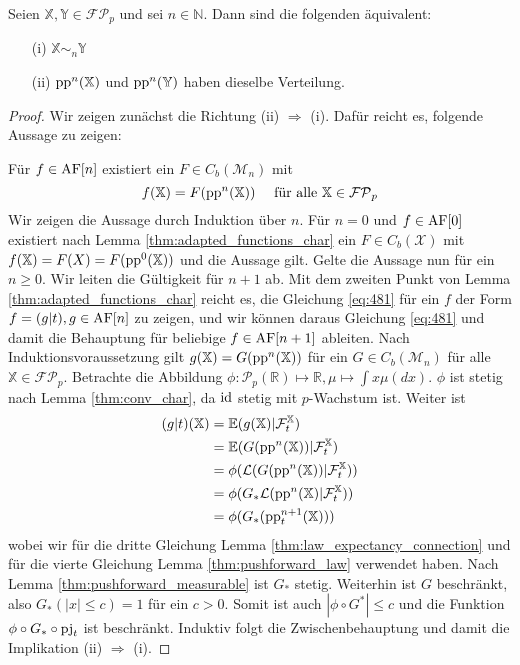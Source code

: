     \begin{lemma}\label{thm:equivalence_adapted_pp}
        Seien $\mathbb{X,Y} \in \mathcal{FP}_p$ und sei $n \in \mathbb{N}$. Dann sind die folgenden äquivalent:
        \begin{enumerate}
            \item[(i)] $\mathbb{X} \sim_n \mathbb{Y}$
            \item[(ii)] $\operatorname{pp}^n(\mathbb{X})$ und $\operatorname{pp}^n(\mathbb{Y})$ haben dieselbe Verteilung.
        \end{enumerate}
    \end{lemma}
    \begin{proof}
        Wir zeigen zunächst die Richtung (ii) $\Rightarrow$ (i). Dafür reicht es, folgende Aussage zu zeigen:

        Für $f \in \operatorname{AF}[n]$ existiert ein $F \in C_b(\mathcal{M}_n)$ mit 
        \begin{equation}\label{eq:481}
            f(\mathbb{X}) = F(\operatorname{pp}^n(\mathbb{X})) \quad \text{ für alle } \mathbb{X} \in \mathcal{FP}_p
        \end{equation}
        Wir zeigen die Aussage durch Induktion über $n$. Für $n=0$ und $f \in \operatorname{AF}[0]$ existiert nach Lemma \ref{thm:adapted_functions_char} ein $F \in C_b(\mathcal{X})$ mit $f(\mathbb{X})=F(X)=F(\operatorname{pp}^0(\mathbb{X}))$ und die Aussage gilt. Gelte die Aussage nun für ein $n\geq 0$. Wir leiten die Gültigkeit für $n+1$ ab. Mit dem zweiten Punkt von Lemma \ref{thm:adapted_functions_char} reicht es, die Gleichung \ref{eq:481} für ein $f$ der Form $f=(g\vert t), g\in \operatorname{AF}[n]$ zu zeigen, und wir können daraus Gleichung \ref{eq:481} und damit die Behauptung für beliebige $f \in \operatorname{AF}[n+1]$ ableiten. Nach Induktionsvoraussetzung gilt $g(\mathbb{X}) = G(\operatorname{pp}^n(\mathbb{X}))$ für ein $G \in C_b(\mathcal{M}_n)$ für alle $\mathbb{X}\in\mathcal{FP}_p$. Betrachte die Abbildung $\phi: \mathcal{P}_p(\mathbb{R}) \mapsto \mathbb{R}, \mu \mapsto \int x\mu(dx)$. $\phi$ ist stetig nach Lemma \ref{thm:conv_char}, da $\operatorname{id}$ stetig mit $p$-Wachstum ist. Weiter ist 
        \begin{align*}
            (g\vert t)(\mathbb{X}) &= \mathbb{E}(g(\mathbb{X}) \vert \mathcal{F}_t^\mathbb{X}) \\
            &= \mathbb{E}(G(\operatorname{pp}^n(\mathbb{X})) \vert \mathcal{F}_t^\mathbb{X}) \\
            &= \phi(\mathcal{L}(G(\operatorname{pp}^n(\mathbb{X})) \vert \mathcal{F}_t^\mathbb{X})) \\
            &= \phi(G_*\mathcal{L}(\operatorname{pp}^n(\mathbb{X}) \vert \mathcal{F}_t^\mathbb{X})) \\
            &= \phi(G_*(\operatorname{pp}^{n+1}_t(\mathbb{X})))
        \end{align*}
        wobei wir für die dritte Gleichung Lemma \ref{thm:law_expectancy_connection} und für die vierte Gleichung Lemma \ref{thm:pushforward_law} verwendet haben. Nach Lemma \ref{thm:pushforward_measurable} ist $G_*$ stetig. Weiterhin ist $G$ beschränkt, also $G_*(|x| \leq c)=1$ für ein $c>0$. Somit ist auch $|\phi\circ G^*| \leq c$ und die Funktion $\phi \circ G_* \circ \operatorname{pj}_t$ ist beschränkt. Induktiv folgt die Zwischenbehauptung und damit die Implikation (ii) $\Rightarrow$ (i).


\end{proof}
